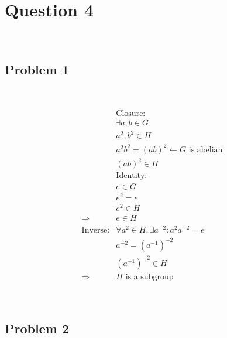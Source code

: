 \documentclass{article}
\begin{document}
\newpage

\section*{Question 4}

~

\subsection*{Problem 1}

~

\begin{equation*}
    \begin{split}
        &\text{Closure}:\\
        &\exists a,b\in G\\
        &a^2,b^2\in H\\
        &a^2b^2=(ab)^2\leftarrow G\text{ is abelian}\\
        &(ab)^2\in H\\
        &\text{Identity}:\\
        &e\in G\\
        &e^2=e\\
        &e^2\in H\\
        \Rightarrow&e\in H\\
        \text{Inverse}:
        &\forall a^2\in H,\exists a^{-2}:a^2a^{-2}=e\\
        &a^{-2}=(a^{-1})^{-2}\\
        &(a^{-1})^{-2}\in H\\
        \Rightarrow&H\text{ is a subgroup}
    \end{split}
\end{equation*}

~

\subsection*{Problem 2}
\end{document}

